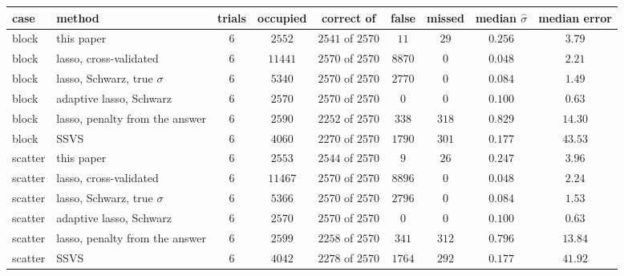 \begin{center}
\footnotesize
\begin{tabular}{llccccccc}
case & method & trials & occupied & correct of & false & missed & median $\hat\sigma$ & median error \\
\hline
block & this paper & $6$ & $2552$ & $2541$ of $2570$ & $11$ & $29$ & $0.256$ & $3.79$ \\
block & lasso, cross-validated & $6$ & $11441$ & $2570$ of $2570$ & $8870$ & $0$ & $0.048$ & $2.21$ \\
block & lasso, Schwarz, true $\sigma$ & $6$ & $5340$ & $2570$ of $2570$ & $2770$ & $0$ & $0.084$ & $1.49$ \\
block & adaptive lasso, Schwarz & $6$ & $2570$ & $2570$ of $2570$ & $0$ & $0$ & $0.100$ & $0.63$ \\
block & lasso, penalty from the answer & $6$ & $2590$ & $2252$ of $2570$ & $338$ & $318$ & $0.829$ & $14.30$ \\
block & SSVS & $6$ & $4060$ & $2270$ of $2570$ & $1790$ & $301$ & $0.177$ & $43.53$ \\
\hline
scatter & this paper & $6$ & $2553$ & $2544$ of $2570$ & $9$ & $26$ & $0.247$ & $3.96$ \\
scatter & lasso, cross-validated & $6$ & $11467$ & $2570$ of $2570$ & $8896$ & $0$ & $0.048$ & $2.24$ \\
scatter & lasso, Schwarz, true $\sigma$ & $6$ & $5366$ & $2570$ of $2570$ & $2796$ & $0$ & $0.084$ & $1.53$ \\
scatter & adaptive lasso, Schwarz & $6$ & $2570$ & $2570$ of $2570$ & $0$ & $0$ & $0.100$ & $0.63$ \\
scatter & lasso, penalty from the answer & $6$ & $2599$ & $2258$ of $2570$ & $341$ & $312$ & $0.796$ & $13.84$ \\
scatter & SSVS & $6$ & $4042$ & $2278$ of $2570$ & $1764$ & $292$ & $0.177$ & $41.92$ \\
\end{tabular}
\end{center}
